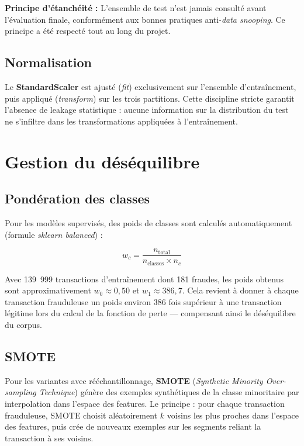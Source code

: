 \textbf{Principe d'étanchéité :} L'ensemble de test n'est jamais consulté avant
l'évaluation finale, conformément aux bonnes pratiques anti-\textit{data snooping}.
Ce principe a été respecté tout au long du projet.

\subsection{Normalisation}

Le \textbf{StandardScaler} est ajusté (\textit{fit}) exclusivement sur l'ensemble
d'entraînement, puis appliqué (\textit{transform}) sur les trois partitions. Cette
discipline stricte garantit l'absence de leakage statistique : aucune information sur la
distribution du test ne s'infiltre dans les transformations appliquées à l'entraînement.

\section{Gestion du déséquilibre}

\subsection{Pondération des classes}

Pour les modèles supervisés, des poids de classes sont calculés automatiquement
(formule \textit{sklearn balanced}) :

\[
w_c = \frac{n_{\text{total}}}{n_{\text{classes}} \times n_c}
\]

Avec 139~999 transactions d'entraînement dont 181 fraudes, les poids obtenus sont
approximativement $w_0 \approx 0{,}50$ et $w_1 \approx 386{,}7$. Cela revient à donner
à chaque transaction frauduleuse un poids environ 386 fois supérieur à une transaction
légitime lors du calcul de la fonction de perte --- compensant ainsi le déséquilibre du
corpus.

\subsection{SMOTE}

Pour les variantes avec rééchantillonnage, \textbf{SMOTE} (\textit{Synthetic Minority
Over-sampling Technique}) génère des exemples synthétiques de la classe minoritaire par
interpolation dans l'espace des features. Le principe : pour chaque transaction frauduleuse,
SMOTE choisit aléatoirement $k$ voisins les plus proches dans l'espace des features, puis
crée de nouveaux exemples sur les segments reliant la transaction à ses voisins.

